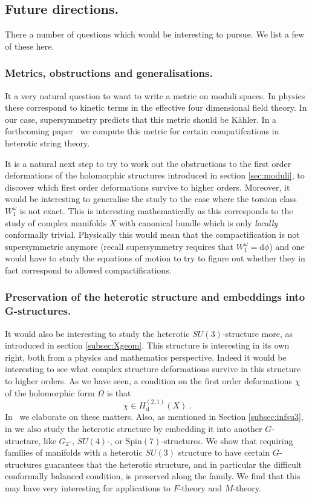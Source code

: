 \documentclass[12pt,a4paper]{article}
\def\d{\textrm{d}}
\theoremstyle{definition}
\begin{document}
\subsection{Future directions.}
There a number of questions which would be interesting to pursue. We list a few of these here.

\subsubsection*{Metrics, obstructions and generalisations.}
It a very natural question to want to write a metric on moduli spaces.  In physics these correspond to kinetic terms in the effective four dimensional field theory. In our case, supersymmetry predicts that this metric should be K\"ahler.  In a forthcoming paper~\cite{Candelas2014} we compute this metric for certain compatifcations in heterotic string theory. 

It is a natural next step to try to work out the obstructions to the first order deformations of  the holomorphic structures introduced in section \ref{sec:moduli}, to discover which first order deformations survive to higher orders. 
Moreover, it would be interesting to generalise the study to the case where the torsion class $W_1^{\omega}$ is not exact.  
This is interesting mathematically as this corresponds to the study of complex  manifolds $X$ with canonical bundle which is only {\it locally} conformally trivial.  Physically this would mean that the compactification is not supersymmetric anymore (recall supersymmetry requires that $W_1^{\omega}=\d\phi$) and one would have to study the equations of motion to try to figure out whether they in fact correspond to allowed compactifications.

\subsubsection*{Preservation of the heterotic structure and embeddings into G-structures.}
It would also be interesting to study the heterotic $SU(3)$-structure more, as introduced in section \ref{subsec:Xgeom}. This structure is interesting in its own right, both from a physics and mathematics perspective. Indeed it would be interesting to see what complex structure deformations survive in this structure to higher orders. As we have seen, a condition on the first order deformations $\chi$ of the holomorphic form $\Omega$ is that
\begin{equation*}
\chi\in H^{(2,1)}_{\d}(X)\:.
\end{equation*}
In~\citep{DKS2014} we elaborate on these matters.  Also, as mentioned in Section \ref{subsec:infsu3}, in \citep{DKS2014} we also study the heterotic structure by embedding it into another $G$-structure, like $G_2$-, $SU(4)$-, or $\text{Spin}(7)$-structures. We show that requiring families of manifolds with a heterotic  $SU(3)$ structure to have certain $G$-structures guarantees that the heterotic structure, and in particular the difficult conformally balanced condition, is preserved along the family. 
We find that this may have very interesting for applications to $F$-theory and $M$-theory. 
\end{document}
